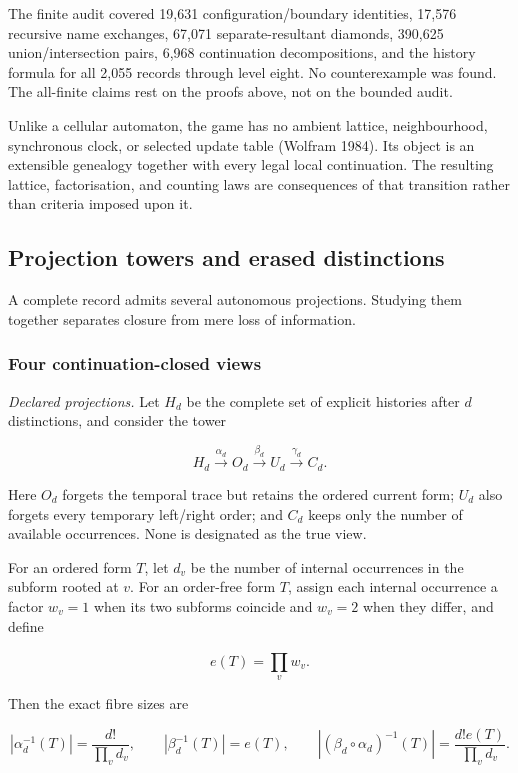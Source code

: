 \documentclass[11pt,a4paper]{article}
\begin{document}
The finite audit covered 19,631 configuration/boundary identities,
17,576 recursive name exchanges, 67,071 separate-resultant diamonds,
390,625 union/intersection pairs, 6,968 continuation decompositions, and
the history formula for all 2,055 records through level eight. No
counterexample was found. The all-finite claims rest on the proofs
above, not on the bounded audit.

Unlike a cellular automaton, the game has no ambient lattice,
neighbourhood, synchronous clock, or selected update table (Wolfram
1984). Its object is an extensible genealogy together with every legal
local continuation. The resulting lattice, factorisation, and counting
laws are consequences of that transition rather than criteria imposed
upon it.

\subsection{Projection towers and erased
distinctions}

A complete record admits several autonomous projections. Studying them
together separates closure from mere loss of information.

\subsubsection{Four continuation-closed
views}

\emph{Declared projections.} Let \(H_{d}\) be the complete set of
explicit histories after \(d\) distinctions, and consider the tower

\[H_{d}\overset{\alpha_{d}}{\rightarrow}O_{d}\overset{\beta_{d}}{\rightarrow}U_{d}\overset{\gamma_{d}}{\rightarrow}C_{d}.\]

Here \(O_{d}\) forgets the temporal trace but retains the ordered
current form; \(U_{d}\) also forgets every temporary left/right order;
and \(C_{d}\) keeps only the number of available occurrences. None is
designated as the true view.

For an ordered form \(T\), let \(d_{v}\) be the number of internal
occurrences in the subform rooted at \(v\). For an order-free form
\(T\), assign each internal occurrence a factor \(w_{v} = 1\) when its
two subforms coincide and \(w_{v} = 2\) when they differ, and define

\[e(T) = \prod_{v}^{}w_{v}.\]

Then the exact fibre sizes are

\[\left| \alpha_{d}^{- 1}(T) \right| = \frac{d!}{\prod_{v}^{}d_{v}},\quad\quad\left| \beta_{d}^{- 1}(T) \right| = e(T),\quad\quad\left| \left( \beta_{d} \circ \alpha_{d} \right)^{- 1}(T) \right| = \frac{d!e(T)}{\prod_{v}^{}d_{v}}.\]
\end{document}

